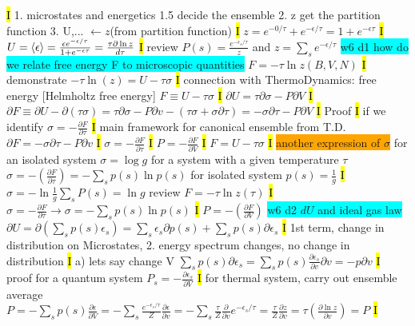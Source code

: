\documentclass[fontsize=4pt]{scrartcl}
\begin{document}
\hl{I}
1. microstates and energetics
1.5 decide the ensemble
2. z get the partition function
3. U,... $\leftarrow z$(from partition function)
\hl{I}
$z=e^{-0/\tau} + e^{-\epsilon/\tau} = 1+e^{-\epsilon \tau}$
\hl{I}
$U = \expval{\epsilon} = \frac{\epsilon e^{-\epsilon/\tau}}{1 +e^{-\epsilon \tau}} = \frac{\tau \partial \ln z}{d\tau}$
\hl{I}
review $P(s) = \frac{e^{-\epsilon_s/\tau}}{z}$ and $z =\sum_s e^{-\epsilon/\tau}$
\colorbox{Cyan}{w6 d1 how do we relate free energy F to microscopic quantities}
$F = -\tau \ln z(B,V,N)$
\hl{I}
demonstrate $-\tau \ln(z) = U-\tau \sigma $
\hl{I}
connection with ThermoDynamics: free energy [Helmholtz free energy]
$F \equiv U-\tau \sigma$
\hl{I}
$\partial U = \tau \partial \sigma - P \partial V$
\hl{I}
$\partial F \equiv \partial U - \partial(\tau \sigma) = \tau  \partial \sigma - P\partial v - (\tau \sigma + \sigma \partial \tau) = -\sigma \partial \tau - P \partial V$
\hl{I}
\colorbox{Periwinkle}{Proof}
\hl{I}
if we identify $\sigma = -\frac{\partial F}{\partial \tau}$
\hl{I}
main framework for canonical ensemble from T.D.
$\partial F = -\sigma \partial \tau - P \partial v$
\hl{I}
$\sigma = -\frac{\partial F}{\partial \tau}$
\hl{I}
$P = -\frac{\partial F}{\partial V}$
\hl{I}
$F = U - \tau \sigma$
\hl{I}
\colorbox{Orange}{another expression of $\sigma$}
for an isolated system $\sigma = \log g$
for a system with a given temperature $\tau$
$\sigma = -(\frac{\partial F}{\partial \tau}) = -\sum_s p(s) \ln p(s)$ for isolated system $p(s) = \frac{1}{g}$
\hl{I}
$\sigma = -\ln \frac{1}{g} \sum_s P(s) = \ln g$
review 
$F = -\tau \ln z(\tau)$
\hl{I}
$\sigma = -\frac{\partial F}{\partial \tau} \rightarrow \sigma = -\sum_{s} p(s) \ln p(s)$
\hl{I}
$P = -(\frac{\partial F}{\partial V})$
\colorbox{Cyan}{w6 d2 $dU$ and ideal gas law }
$\partial U = \partial (\sum_{s} p(s) \epsilon_s) = \sum_s \epsilon_s \partial p(s) +  \sum_s p(s) \partial \epsilon_s$
\hl{I} 
1st term, change in distribution on Microstates, 2. energy spectrum changes, no change in distribution
\hl{I}
a) lets say change V
$\sum_s p(s) \partial \epsilon_s = \sum_s p(s) \frac{\partial \epsilon_s}{\partial v} \partial v = -p \partial v$
\hl{I}
proof for a quantum system
$P_s= -\frac{\partial \epsilon_s}{\partial V}$
\hl{I}
for thermal system, carry out ensemble average
$P = -\sum_s p(s) \frac{\partial \epsilon}{\partial V}= -\sum_s \frac{e^{-\epsilon_s /\tau}}{Z} \frac{\partial \epsilon}{\partial v} = -\sum_s \frac{\tau}{Z} \frac{\partial}{\partial v}e^{-\epsilon_s /\tau} = \frac{\tau}{Z} \frac{\partial z}{\partial v} = \tau (\frac{\partial \ln z}{\partial v}) = P$
\hl{I}
\end{document}
